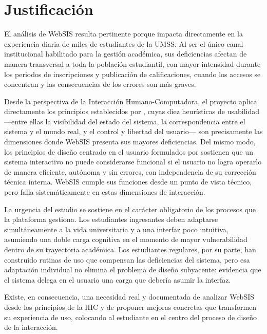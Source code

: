 \section{Justificación}

    El análisis de WebSIS resulta pertinente porque impacta directamente en la experiencia diaria de miles de estudiantes de la UMSS. Al ser el único canal institucional habilitado para la gestión académica, sus deficiencias afectan de manera transversal a toda la población estudiantil, con mayor intensidad durante los periodos de inscripciones y publicación de calificaciones, cuando los accesos se concentran y las consecuencias de los errores son más graves.

    Desde la perspectiva de la Interacción Humano-Computadora, el proyecto aplica directamente los principios establecidos por \textcite{nielsen1994}, cuyas diez heurísticas de usabilidad —entre ellas la visibilidad del estado del sistema, la correspondencia entre el sistema y el mundo real, y el control y libertad del
    usuario— son precisamente las dimensiones donde WebSIS presenta sus mayores deficiencias. Del mismo modo, los principios de diseño centrado en el usuario formulados por \textcite{norman2002} sostienen que un sistema interactivo no puede considerarse funcional si el usuario no logra operarlo de manera eficiente, autónoma y sin errores, con independencia de su corrección técnica interna. WebSIS cumple sus funciones desde un punto de vista técnico, pero falla sistemáticamente en estas dimensiones de
    interacción.

    La urgencia del estudio se sostiene en el carácter obligatorio de los procesos que la plataforma gestiona. Los estudiantes ingresantes deben adaptarse simultáneamente a la vida universitaria y a una interfaz poco intuitiva, asumiendo una doble carga cognitiva en el momento de mayor vulnerabilidad dentro de su trayectoria académica. Los estudiantes regulares, por su parte, han construido rutinas de uso que compensan las deficiencias del sistema, pero esa adaptación individual no elimina el problema de diseño subyacente: evidencia que el sistema delega en el usuario una carga que debería asumir la interfaz.

    Existe, en consecuencia, una necesidad real y documentada de analizar WebSIS desde los principios de la IHC y de proponer mejoras concretas que transformen su experiencia de uso, colocando al estudiante en el centro del proceso de diseño de la interacción.